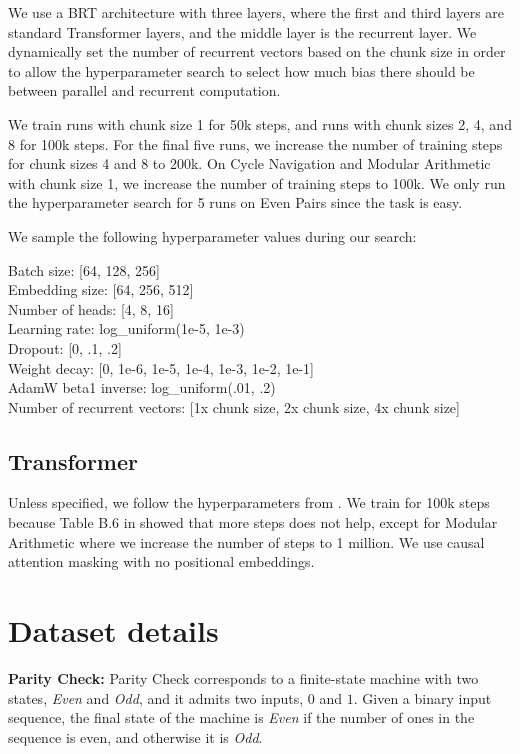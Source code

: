 We use a BRT architecture with three layers, where the first and third layers are standard Transformer layers, and the middle layer is the recurrent layer. We dynamically set the number of recurrent vectors based on the chunk size in order to allow the hyperparameter search to select how much bias there should be between parallel and recurrent computation.

We train runs with chunk size 1 for 50k steps, and runs with chunk sizes 2, 4, and 8 for 100k steps. For the final five runs, we increase the number of training steps for chunk sizes 4 and 8 to 200k. On Cycle Navigation and Modular Arithmetic with chunk size 1, we increase the number of training steps to 100k. We only run the hyperparameter search for 5 runs on Even Pairs since the task is easy.

We sample the following hyperparameter values during our search:

Batch size: [64, 128, 256]\\
Embedding size: [64, 256, 512]\\
Number of heads: [4, 8, 16]\\
Learning rate: log\_uniform(1e-5, 1e-3)\\
Dropout: [0, .1, .2]\\
Weight decay: [0, 1e-6, 1e-5, 1e-4, 1e-3, 1e-2, 1e-1]\\
AdamW beta1 inverse: log\_uniform(.01, .2)\\
Number of recurrent vectors: [1x chunk size, 2x chunk size, 4x chunk size]

\subsection{Transformer}
Unless specified, we follow the hyperparameters from \citet{deletang_neural_2022}. We train for 100k steps because Table B.6 in \citet{deletang_neural_2022} showed that more steps does not help, except for Modular Arithmetic where we increase the number of steps to 1 million. We use causal attention masking with no positional embeddings.

\section{Dataset details} \label{sec:recurrent-dataset-details}

\textbf{Parity Check:} Parity Check corresponds to a finite-state machine with two states, \emph{Even} and \emph{Odd}, and it admits two inputs, $0$ and $1$. Given a binary input sequence, the final state of the machine is \emph{Even} if the number of ones in the sequence is even, and otherwise it is \emph{Odd}. 


